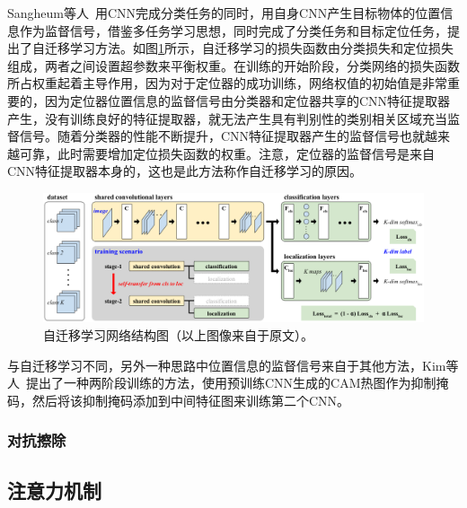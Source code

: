 Sangheum等人~\cite{2015Hwang}用CNN完成分类任务的同时，用自身CNN产生目标物体的位置信息作为监督信号，借鉴多任务学习思想，同时完成了分类任务和目标定位任务，提出了自迁移学习方法。如图\ref{fig:self_transfer_learning}所示，自迁移学习的损失函数由分类损失和定位损失组成，两者之间设置超参数来平衡权重。在训练的开始阶段，分类网络的损失函数所占权重起着主导作用，因为对于定位器的成功训练，网络权值的初始值是非常重要的，因为定位器位置信息的监督信号由分类器和定位器共享的CNN特征提取器产生，没有训练良好的特征提取器，就无法产生具有判别性的类别相关区域充当监督信号。随着分类器的性能不断提升，CNN特征提取器产生的监督信号也就越来越可靠，此时需要增加定位损失函数的权重。注意，定位器的监督信号是来自CNN特征提取器本身的，这也是此方法称作自迁移学习的原因。
\begin{figure}[h]
	\centering
	\includegraphics[width=1.0\textwidth]{figure/self_transfer_learning}
	\caption{自迁移学习网络结构图（以上图像来自于原文）。} 
	\label{fig:self_transfer_learning}
\end{figure}

与自迁移学习不同，另外一种思路中位置信息的监督信号来自于其他方法，Kim等人~\cite{Kim_2017_ICCV}提出了一种两阶段训练的方法，使用预训练CNN生成的CAM热图作为抑制掩码，然后将该抑制掩码添加到中间特征图来训练第二个CNN。

\subsubsection{对抗擦除}

\subsection{注意力机制}


